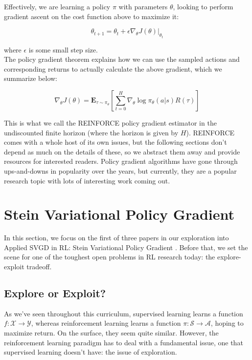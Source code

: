 \documentclass[12pt]{article}
\begin{document}
\noindent Effectively, we are learning a policy $\pi$ with parameters $\theta$, looking to perform gradient ascent on the cost function above to maximize it:

\begin{equation}
    \theta_{t+1} = \theta_t + \epsilon \nabla_\theta J(\theta) |_{\theta_t}
\end{equation}

\noindent  where $\epsilon$ is some small step size. \\

\noindent  The policy gradient theorem explains how we can use the sampled actions and corresponding returns to actually calculate the above gradient, which we summarize below:

\begin{equation}
    \nabla_\theta J(\theta) = \mathbf{E}_{\tau \sim \pi_\theta} [\sum_{t=0}^H \nabla_\theta \log \pi_\theta(a | s)R(\tau)]
\end{equation}

\noindent This is what we call the REINFORCE policy gradient estimator \cite{reinforce} in the undiscounted finite horizon (where the horizon is given by $H$). REINFORCE comes with a whole host of its own issues, but the following sections don't depend as much on the details of these, so we abstract them away and provide resources for interested readers. Policy gradient algorithms have gone through ups-and-downs in popularity over the years, but currently, they are a popular research topic with lots of interesting work coming out.

\section{Stein Variational Policy Gradient}

In this section, we focus on the first of three papers in our exploration into Applied SVGD in RL: Stein Variational Policy Gradient \cite{liu2017stein}. Before that, we set the scene for one of the toughest open problems in RL research today: the explore-exploit tradeoff.

\subsection{Explore or Exploit?}

As we've seen throughout this curriculum, supervised learning learns a function $f: \mathcal{X} \rightarrow \mathcal{Y}$, whereas reinforcement learning learns a function $\pi: \mathcal{S} \rightarrow \mathcal{A}$, hoping to maximize return. On the surface, they seem quite similar. However, the reinforcement learning paradigm has to deal with a fundamental issue, one that supervised learning doesn't have: the issue of exploration. \\ 
\end{document}
